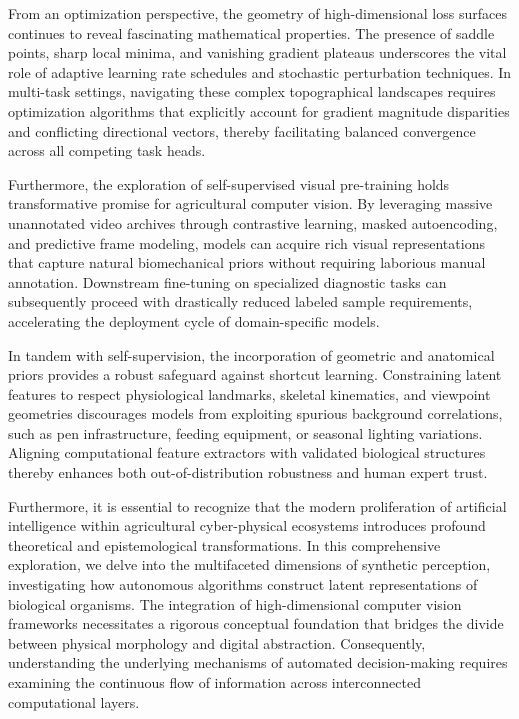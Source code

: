 \documentclass[Times,12pt,oneside,openany,print,index]{report}
\begin{document}
From an optimization perspective, the geometry of high-dimensional loss surfaces continues to reveal fascinating mathematical properties. The presence of saddle points, sharp local minima, and vanishing gradient plateaus underscores the vital role of adaptive learning rate schedules and stochastic perturbation techniques. In multi-task settings, navigating these complex topographical landscapes requires optimization algorithms that explicitly account for gradient magnitude disparities and conflicting directional vectors, thereby facilitating balanced convergence across all competing task heads.

Furthermore, the exploration of self-supervised visual pre-training holds transformative promise for agricultural computer vision. By leveraging massive unannotated video archives through contrastive learning, masked autoencoding, and predictive frame modeling, models can acquire rich visual representations that capture natural biomechanical priors without requiring laborious manual annotation. Downstream fine-tuning on specialized diagnostic tasks can subsequently proceed with drastically reduced labeled sample requirements, accelerating the deployment cycle of domain-specific models.

In tandem with self-supervision, the incorporation of geometric and anatomical priors provides a robust safeguard against shortcut learning. Constraining latent features to respect physiological landmarks, skeletal kinematics, and viewpoint geometries discourages models from exploiting spurious background correlations, such as pen infrastructure, feeding equipment, or seasonal lighting variations. Aligning computational feature extractors with validated biological structures thereby enhances both out-of-distribution robustness and human expert trust.

Furthermore, it is essential to recognize that the modern proliferation of artificial intelligence within agricultural cyber-physical ecosystems introduces profound theoretical and epistemological transformations. In this comprehensive exploration, we delve into the multifaceted dimensions of synthetic perception, investigating how autonomous algorithms construct latent representations of biological organisms. The integration of high-dimensional computer vision frameworks necessitates a rigorous conceptual foundation that bridges the divide between physical morphology and digital abstraction. Consequently, understanding the underlying mechanisms of automated decision-making requires examining the continuous flow of information across interconnected computational layers.
\end{document}
